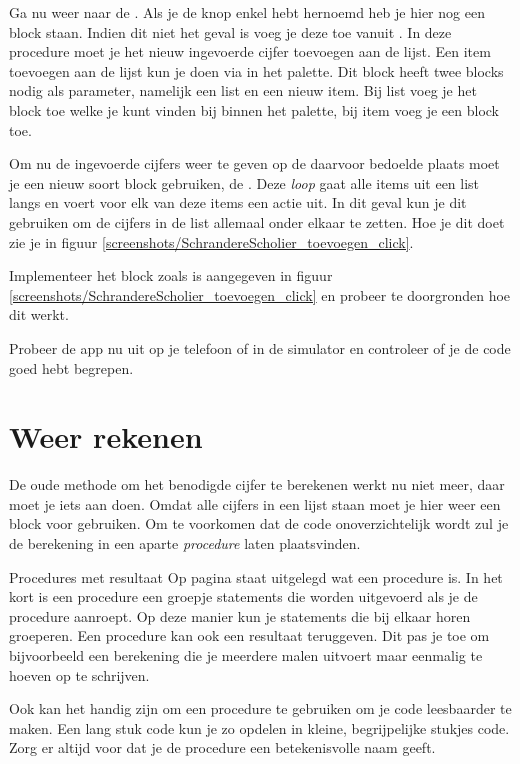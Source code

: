 Ga nu weer naar de . Als je de knop enkel hebt hernoemd heb je hier nog een block  staan. Indien dit niet het geval is voeg je deze toe vanuit . In deze procedure moet je het nieuw ingevoerde cijfer toevoegen aan de lijst. Een item toevoegen aan de lijst kun je doen via  in het  palette. Dit block heeft twee blocks nodig als parameter, namelijk een list en een nieuw item. Bij list voeg je het  block toe welke je kunt vinden bij  binnen het  palette, bij item voeg je een block  toe. 

Om nu de ingevoerde cijfers weer te geven op de daarvoor bedoelde plaats moet je een nieuw soort block gebruiken, de . Deze \emph{loop} gaat alle items uit een list langs en voert voor elk van deze items een actie uit. In dit geval kun je dit gebruiken om de cijfers in de list allemaal onder elkaar te zetten. Hoe je dit doet zie je in figuur \ref{screenshots/SchrandereScholier_toevoegen_click}.

 \begin{opgave}
    \opgVraag
Implementeer het  block zoals is aangegeven in figuur \ref{screenshots/SchrandereScholier_toevoegen_click} en probeer te doorgronden hoe dit werkt.
\end{opgave}

\runOpTelefoon{} Probeer de app nu uit op je telefoon of in de simulator en controleer of je de code goed hebt begrepen.

\section{Weer rekenen}
De oude methode om het benodigde cijfer te berekenen werkt nu niet meer, daar moet je iets aan doen. Omdat alle cijfers in een lijst staan moet je hier weer een  block voor gebruiken. Om te voorkomen dat de code onoverzichtelijk wordt zul je de berekening in een aparte \emph{procedure} laten plaatsvinden. 

\begin{derivation}{Procedures met resultaat}
Op pagina \pageref{der:procedures} staat uitgelegd wat een procedure is. In het kort is een procedure een groepje statements die worden uitgevoerd als je de procedure aanroept. Op deze manier kun je statements die bij elkaar horen groeperen. Een procedure kan ook een resultaat teruggeven. Dit pas je toe om bijvoorbeeld een berekening die je meerdere malen uitvoert maar eenmalig te hoeven op te schrijven. 

Ook kan het handig zijn om een procedure te gebruiken om je code leesbaarder te maken. Een lang stuk code kun je zo opdelen in kleine, begrijpelijke stukjes code. Zorg er altijd voor dat je de procedure een betekenisvolle naam geeft.
\end{derivation}

